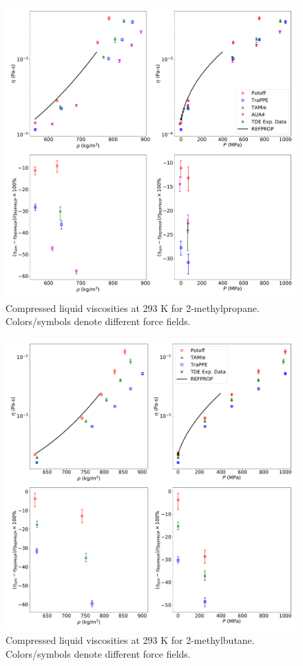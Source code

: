 \documentclass[preprint,review,12pt]{elsarticle}
\begin{document}
	\begin{figure}[htb!]
		\centering
		\includegraphics[width=6.4in]{compare_REFPROP_T293highP_IC4H10.pdf}
		\caption{Compressed liquid viscosities at 293 K for 2-methylpropane. Colors/symbols denote different force fields.}
		\label{fig:T293highP_IC4}
	\end{figure} 
	
	\begin{figure}[htb!]
		\centering
		\includegraphics[width=6.4in]{compare_REFPROP_T293highP_IC5H12.pdf}
		\caption{Compressed liquid viscosities at 293 K for 2-methylbutane. Colors/symbols denote different force fields.}
		\label{fig:T293highP_IC5}
	\end{figure} 
	
\end{document}
